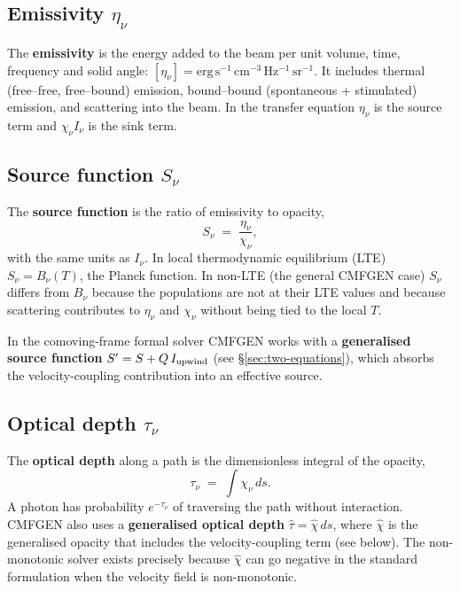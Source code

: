 \documentclass[11pt]{article}
\begin{document}
\subsection{Emissivity \texorpdfstring{$\eta_\nu$}{eta\_nu}}

The \textbf{emissivity} is the energy added to the beam per unit volume,
time, frequency and solid angle:
$[\eta_\nu] = \mathrm{erg\,s^{-1}\,cm^{-3}\,Hz^{-1}\,sr^{-1}}$.  It
includes thermal (free--free, free--bound) emission, bound--bound
(spontaneous + stimulated) emission, and scattering into the beam.  In
the transfer equation $\eta_\nu$ is the source term and $\chi_\nu I_\nu$
is the sink term.

\subsection{Source function \texorpdfstring{$S_\nu$}{S\_nu}}

The \textbf{source function} is the ratio of emissivity to opacity,
\begin{equation}
  S_\nu \;=\; \frac{\eta_\nu}{\chi_\nu},
\end{equation}
with the same units as $I_\nu$.  In local thermodynamic equilibrium
(LTE) $S_\nu = B_\nu(T)$, the Planck function.  In non-LTE (the general
CMFGEN case) $S_\nu$ differs from $B_\nu$ because the populations are
not at their LTE values and because scattering contributes to
$\eta_\nu$ and $\chi_\nu$ without being tied to the local $T$.

In the comoving-frame formal solver CMFGEN works with a
\textbf{generalised source function}
$S' = S + Q\,I_{\rm upwind}$ (see \S\ref{sec:two-equations}), which
absorbs the velocity-coupling contribution into an effective source.

\subsection{Optical depth \texorpdfstring{$\tau_\nu$}{tau\_nu}}

The \textbf{optical depth} along a path is the dimensionless integral
of the opacity,
\begin{equation}
  \tau_\nu \;=\; \int \chi_\nu\,ds .
\end{equation}
A photon has probability $e^{-\tau_\nu}$ of traversing the path without
interaction.  CMFGEN also uses a \textbf{generalised optical depth}
$\hat\tau = \hat\chi\,ds$, where $\hat\chi$ is the generalised opacity
that includes the velocity-coupling term (see below).  The non-monotonic
solver exists precisely because $\hat\chi$ can go negative in the
standard formulation when the velocity field is non-monotonic.
\end{document}
